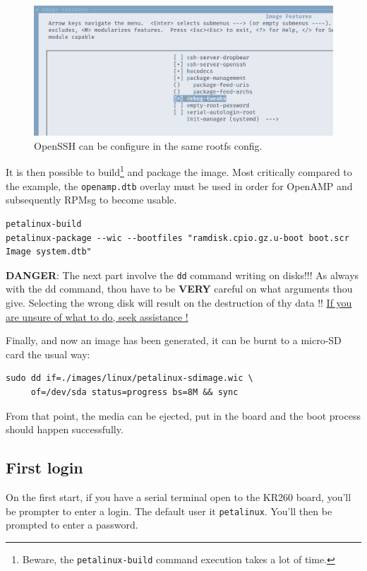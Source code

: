 \documentclass[10pt]{article}
\begin{document}
\begin{figure}[htbp]
\centering
\includegraphics[width=.6\textwidth]{./img/yocto_ssh.png}
\caption{\label{fig:orgc2ca29e}OpenSSH can be configure in the same rootfs config.}
\end{figure}

It is then possible to build\footnote{Beware, the \texttt{petalinux-build} command execution takes a lot of time.} and package the image. Most critically compared to the example,
the \texttt{openamp.dtb} overlay must be used in order for OpenAMP and subsequently RPMsg to become usable.
\begin{verbatim}
petalinux-build
petalinux-package --wic --bootfiles "ramdisk.cpio.gz.u-boot boot.scr Image system.dtb"
\end{verbatim}

\begin{tcolorbox}[colback=red!5!white,colframe=red!75!black]
\textbf{DANGER}: The next part involve the \texttt{dd} command writing on disks!!!
As always with the dd command, thou have to be \textbf{VERY} careful on what arguments
thou give. Selecting the wrong disk will result on the destruction of
thy data !!
\uline{If you are unsure of what to do, seek assistance !}
\end{tcolorbox}

Finally, and now an image has been generated, it can be burnt to a micro-SD card the usual way:
\begin{verbatim}
sudo dd if=./images/linux/petalinux-sdimage.wic \
     of=/dev/sda status=progress bs=8M && sync
\end{verbatim}

From that point, the media can be ejected, put in the board and the boot process
should happen successfully.

\subsection{First login}
\label{sec:org9bf2e97}
On the first start, if you have a serial terminal open to the KR260 board, you'll be prompter to enter a login.
The default user it \texttt{petalinux}. You'll then be prompted to enter a password.
\end{document}
